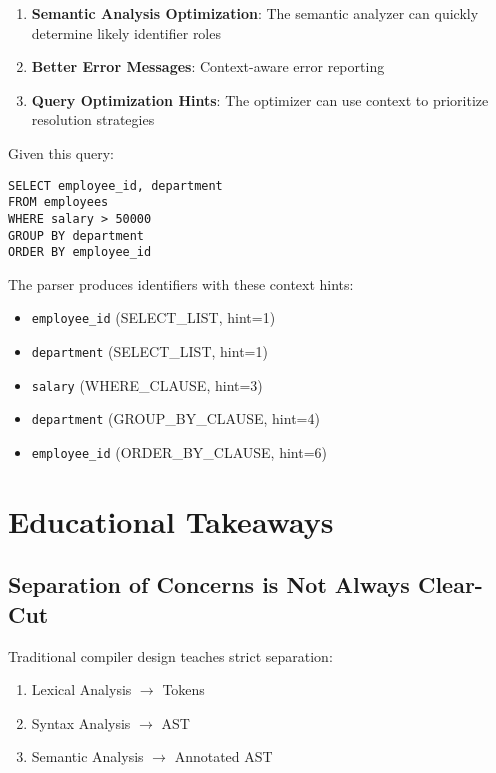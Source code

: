 \documentclass[11pt,a4paper]{article}
\begin{document}
\begin{enumerate}
    \item \textbf{Semantic Analysis Optimization}: The semantic analyzer can quickly determine likely identifier roles
    \item \textbf{Better Error Messages}: Context-aware error reporting
    \item \textbf{Query Optimization Hints}: The optimizer can use context to prioritize resolution strategies
\end{enumerate}

\begin{tcolorbox}[colback=blue!5!white,colframe=blue!60!black,title=Example: Context Hints in Action]
Given this query:
\begin{lstlisting}[style=sql]
SELECT employee_id, department 
FROM employees 
WHERE salary > 50000
GROUP BY department
ORDER BY employee_id
\end{lstlisting}

The parser produces identifiers with these context hints:
\begin{itemize}
    \item \texttt{employee\_id} (SELECT\_LIST, hint=1)
    \item \texttt{department} (SELECT\_LIST, hint=1)
    \item \texttt{salary} (WHERE\_CLAUSE, hint=3)
    \item \texttt{department} (GROUP\_BY\_CLAUSE, hint=4)
    \item \texttt{employee\_id} (ORDER\_BY\_CLAUSE, hint=6)
\end{itemize}
\end{tcolorbox}

\section{ Educational Takeaways}

\subsection{Separation of Concerns is Not Always Clear-Cut}

Traditional compiler design teaches strict separation:
\begin{enumerate}
    \item Lexical Analysis $\rightarrow$ Tokens
    \item Syntax Analysis $\rightarrow$ AST
    \item Semantic Analysis $\rightarrow$ Annotated AST
\end{enumerate}
\end{document}
